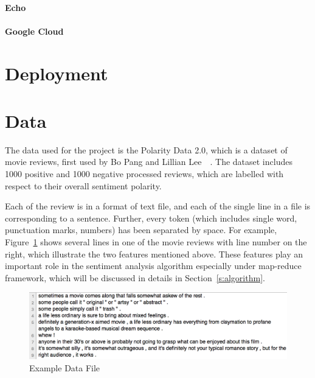 \paragraph{Echo}
\paragraph{Google Cloud}


\section{Deployment}\label{s:deployment}

\section{Data}\label{s:data}

The data used for the project is the Polarity Data 2.0, which is a
dataset of movie reviews, first used by Bo Pang and Lillian
Lee~\cite{hid-sp18-405-sentiment-pang2004asentimental}~\cite{hid-sp18-405-sentiment-pang2002thumbs}.
The dataset includes 1000 positive and 1000 negative processed
reviews, which are labelled with respect to their overall sentiment
polarity.

Each of the review is in a format of text file, and each of the single line in a 
file is corresponding to a sentence. Further, every token (which includes 
single word, punctuation marks, numbers) has been separated by space. For 
example, Figure~\ref{f:data} shows several lines in one of the movie reviews 
with line number on the right, which illustrate the two features mentioned 
above. These features play an important role in the sentiment analysis 
algorithm especially under map-reduce framework, which will be discussed in 
details in Section~\ref{s:algorithm}.
\begin{figure}[!ht]
	\centering\includegraphics[width=\columnwidth]{images/polarity-data.png}
	\caption{Example Data File}\label{f:data}
\end{figure}

